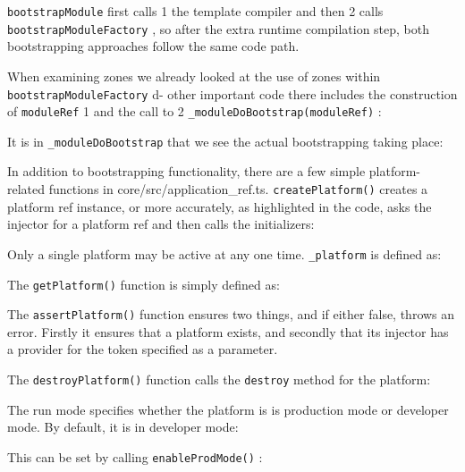 

\texttt{bootstrapModule}
first calls
1
the template compiler and then
2
calls
\texttt{bootstrapModuleFactory}
, so after the extra runtime compilation step, both
bootstrapping approaches follow the same code path.

When examining zones we already looked at the use of zones within
\texttt{bootstrapModuleFactory}
d- other important code there includes the construction of
\texttt{moduleRef}
1
and the call to
2
\texttt{\_moduleDoBootstrap(moduleRef)}
:



It is in
\texttt{\_moduleDoBootstrap}
that we see the actual bootstrapping taking place:



In addition to bootstrapping functionality, there are a few simple platform-related
functions in core/src/application\_ref.ts.
\texttt{createPlatform()}
creates a platform ref
instance, or more accurately, as highlighted in the code, asks the injector for a
platform ref and then calls the initializers:



Only a single platform may be active at any one time.
\texttt{\_platform}
is defined as:



The
\texttt{getPlatform()}
function is simply defined as:



The
\texttt{assertPlatform()}
function ensures two things, and if either false, throws an
error. Firstly it ensures that a platform exists, and secondly that its injector has a
provider for the token specified as a parameter.



The
\texttt{destroyPlatform()}
function calls the
\texttt{destroy}
method for the platform:



The run mode specifies whether the platform is is production mode or developer
mode. By default, it is in developer mode:



This can be set by calling
\texttt{enableProdMode()}
:

